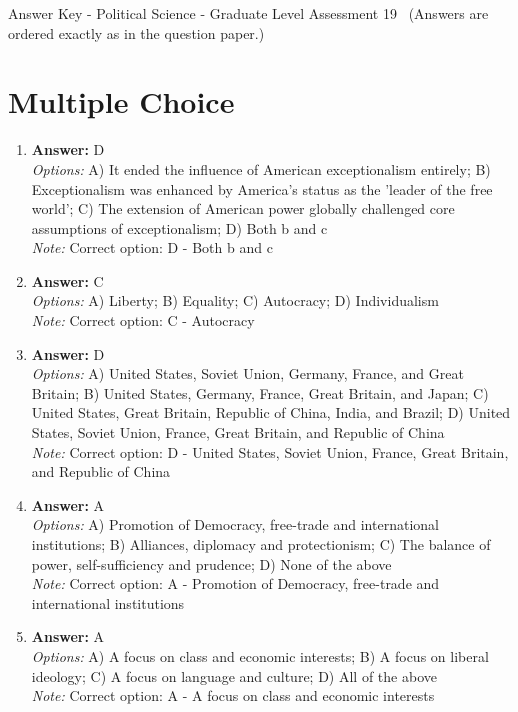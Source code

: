 \documentclass[12pt]{article}
\begin{document}
\begin{center}
Answer Key - Political Science - Graduate Level Assessment 19 \
\small (Answers are ordered exactly as in the question paper.)
\end{center}

\section*{Multiple Choice}
\begin{enumerate}[label=\arabic*.]
\item \textbf{Answer:} D
\\ \textit{Options:} A) It ended the influence of American exceptionalism entirely; B) Exceptionalism was enhanced by America's status as the 'leader of the free world'; C) The extension of American power globally challenged core assumptions of exceptionalism; D) Both b and c
\\ \textit{Note:} Correct option: D - Both b and c
\item \textbf{Answer:} C
\\ \textit{Options:} A) Liberty; B) Equality; C) Autocracy; D) Individualism
\\ \textit{Note:} Correct option: C - Autocracy
\item \textbf{Answer:} D
\\ \textit{Options:} A) United States, Soviet Union, Germany, France, and Great Britain; B) United States, Germany, France, Great Britain, and Japan; C) United States, Great Britain, Republic of China, India, and Brazil; D) United States, Soviet Union, France, Great Britain, and Republic of China
\\ \textit{Note:} Correct option: D - United States, Soviet Union, France, Great Britain, and Republic of China
\item \textbf{Answer:} A
\\ \textit{Options:} A) Promotion of Democracy, free-trade and international institutions; B) Alliances, diplomacy and protectionism; C) The balance of power, self-sufficiency and prudence; D) None of the above
\\ \textit{Note:} Correct option: A - Promotion of Democracy, free-trade and international institutions
\item \textbf{Answer:} A
\\ \textit{Options:} A) A focus on class and economic interests; B) A focus on liberal ideology; C) A focus on language and culture; D) All of the above
\\ \textit{Note:} Correct option: A - A focus on class and economic interests
\end{enumerate}
\end{document}
